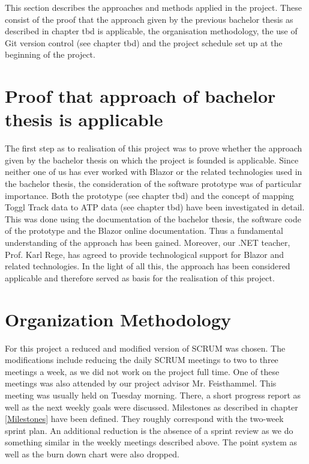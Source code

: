 
This section describes the approaches and methods applied in the project. These consist of the proof that the
approach given by the previous bachelor thesis as described in chapter tbd is applicable, the organisation methodology,
the use of Git version control (see chapter tbd) and the project schedule set up at the beginning of the project.

\section{Proof that approach of bachelor thesis is applicable}
The first step as to realisation of this project was to prove whether the approach given by the bachelor thesis
on which the project is founded is applicable. Since neither one of us has ever worked with Blazor or the 
related technologies used in the bachelor thesis, the consideration of the software prototype was of particular
importance. Both the prototype (see chapter tbd) and the concept of mapping Toggl Track data to ATP data (see
chapter tbd) have been investigated in detail. This was done using the documentation of the bachelor thesis,
the software code of the prototype and the Blazor online documentation. Thus a fundamental understanding of the
approach has been gained. Moreover, our .NET teacher, Prof. Karl Rege, has agreed to provide technological support 
for Blazor and related technologies. In the light of all this, the approach has been considered applicable and
therefore served as basis for the realisation of this project.

\section{Organization Methodology}
For this project a reduced and modified version of SCRUM \cite{scrum_url} was chosen. The modifications include reducing the daily SCRUM meetings to two to three meetings a week, as we did not work on the project full time. One of these meetings was also attended by our project advisor Mr. Feisthammel. This meeting was usually held on Tuesday morning. There, a short progress report as well as the next weekly goals were discussed. Milestones as described in chapter \ref{Milestones} have been defined. They roughly correspond with the two-week sprint plan. An additional reduction is the absence of a sprint review as we do something similar in the weekly meetings described above. The point system as well as the burn down chart were also dropped.

